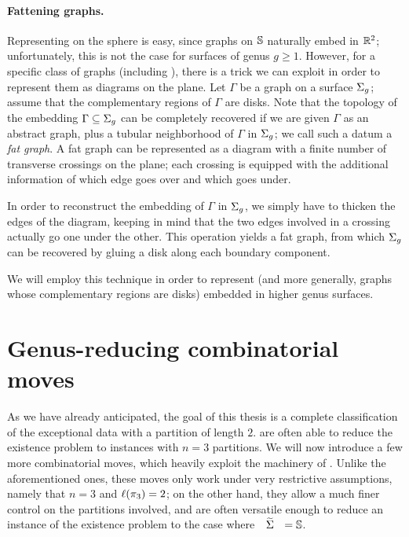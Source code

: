 \paragraph{Fattening graphs.} Representing \dessins{} on the sphere is easy, since graphs on $\mathbb{S}{}$ naturally embed in $\mathbb{R}^2$; unfortunately, this is not the case for surfaces of genus $g\ge 1$. However, for a specific class of graphs (including \dessins{}), there is a trick we can exploit in order to represent them as diagrams on the plane. Let $\Gamma$ be a graph on a surface $\Sigma_{g}$; assume that the complementary regions of $\Gamma$ are disks. Note that the topology of the embedding $\Gamma\subseteq\Sigma_{g}$ can be completely recovered if we are given $\Gamma$ as an abstract graph, plus a tubular neighborhood of $\Gamma$ in $\Sigma_{g}$; we call such a datum a \emph{fat graph}. A fat graph can be represented as a diagram with a finite number of transverse crossings on the plane; each crossing is equipped with the additional information of which edge goes over and which goes under.

In order to reconstruct the embedding of $\Gamma$ in $\Sigma_{g}$, we simply have to thicken the edges of the diagram, keeping in mind that the two edges involved in a crossing actually go one under the other. This operation yields a fat graph, from which $\Sigma_{g}$ can be recovered by gluing a disk along each boundary component.

We will employ this technique in order to represent \dessins{} (and more generally, graphs whose complementary regions are disks) embedded in higher genus surfaces.

\section{Genus-reducing combinatorial moves}\label{dessins:sc:combinatorial-moves}

As we have already anticipated, the goal of this thesis is a complete classification of the exceptional data with a partition of length $2$.  are often able to reduce the existence problem to instances with $n=3$ partitions. We will now introduce a few more combinatorial moves, which heavily exploit the machinery of \dessins{}. Unlike the aforementioned ones, these moves only work under very restrictive assumptions, namely that $n=3$ and $\ell(\pi_3)=2$; on the other hand, they allow a much finer control on the partitions involved, and are often versatile enough to reduce an instance of the existence problem to the case where $\tSigma=\sphere{}$.

